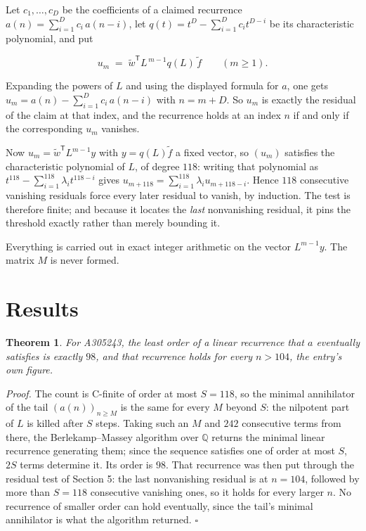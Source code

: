 \documentclass[11pt]{article}
\newtheorem{theorem}{Theorem}
\theoremstyle{definition}
\begin{document}
Let $c_1,\dots,c_D$ be the coefficients of a claimed recurrence $a(n) = \sum_{i=1}^{D} c_i\,a(n-i)$, let $q(t) = t^{D} - \sum_{i=1}^{D} c_i t^{D-i}$ be its characteristic polynomial, and put

\[u_m \;=\; \tilde w^{\mathsf T} L^{\,m-1} q(L)\,\tilde f \qquad (m \ge 1).\]

Expanding the powers of $L$ and using the displayed formula for $a$, one gets $u_m = a(n) - \sum_{i=1}^{D} c_i\,a(n-i)$ with $n = m + D$. So $u_m$ is exactly the residual of the claim at that index, and the recurrence holds at an index $n$ if and only if the corresponding $u_m$ vanishes.

Now $u_m = \tilde w^{\mathsf T} L^{m-1} y$ with $y = q(L)\tilde f$ a fixed vector, so $(u_m)$ satisfies the characteristic polynomial of $L$, of degree $118$: writing that polynomial as $t^{118} - \sum_{i=1}^{118} \lambda_i t^{118-i}$ gives $u_{m+118} = \sum_{i=1}^{118} \lambda_i u_{m+118-i}$. Hence $118$ consecutive vanishing residuals force every later residual to vanish, by induction. The test is therefore finite; and because it locates the {\itshape last} nonvanishing residual, it pins the threshold exactly rather than merely bounding it.

Everything is carried out in exact integer arithmetic on the vector $L^{m-1}y$. The matrix $M$ is never formed.

\section{Results}

\begin{theorem} For A305243, the least order of a linear recurrence that $a$ eventually satisfies is exactly $98$, and that recurrence holds for every $n > 104$, the entry's own figure.\end{theorem}

{\itshape Proof.} The count is C-finite of order at most $S = 118$, so the minimal annihilator of the tail $(a(n))_{n \ge M}$ is the same for every $M$ beyond $S$: the nilpotent part of $L$ is killed after $S$ steps. Taking such an $M$ and $242$ consecutive terms from there, the Berlekamp--Massey algorithm over $\mathbb{Q}$ returns the minimal linear recurrence generating them; since the sequence satisfies one of order at most $S$, $2S$ terms determine it. Its order is $98$. That recurrence was then put through the residual test of Section 5: the last nonvanishing residual is at $n = 104$, followed by more than $S = 118$ consecutive vanishing ones, so it holds for every larger $n$. No recurrence of smaller order can hold eventually, since the tail's minimal annihilator is what the algorithm returned. $\square$
\end{document}
